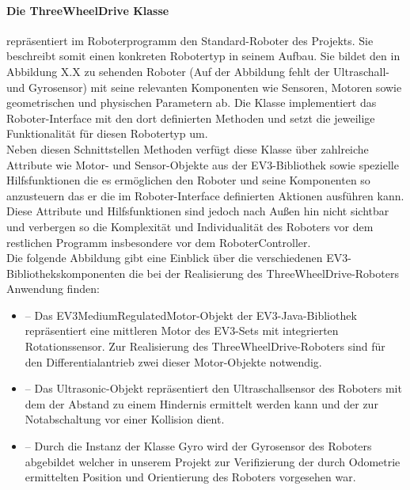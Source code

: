 \paragraph{Die ThreeWheelDrive Klasse}
\color{process}             %
repräsentiert im Roboterprogramm den \glqq{}Standard\grqq{}-Roboter des Projekts. Sie beschreibt somit einen konkreten 
Robotertyp in seinem Aufbau. Sie bildet den in Abbildung X.X zu sehenden Roboter (Auf der Abbildung fehlt der Ultraschall- und Gyrosensor) 
mit seine relevanten Komponenten wie Sensoren, 
Motoren sowie geometrischen und physischen Parametern ab. Die Klasse implementiert das Roboter-Interface mit den dort definierten 
Methoden und setzt die jeweilige Funktionalität für diesen Robotertyp um.\\
Neben diesen Schnittstellen Methoden verfügt diese Klasse über zahlreiche Attribute wie Motor- und Sensor-Objekte aus der 
EV3-Bibliothek sowie spezielle Hilfsfunktionen die es ermöglichen den Roboter und seine Komponenten so anzusteuern das er die im 
Roboter-Interface definierten Aktionen ausführen kann. Diese Attribute und Hilfsfunktionen sind jedoch nach Außen hin nicht
sichtbar und verbergen so die Komplexität und Individualität des Roboters vor dem restlichen Programm insbesondere vor dem 
RoboterController. \\
Die folgende Abbildung gibt eine Einblick über die verschiedenen EV3-Bibliothekskompo\-nenten die bei der Realisierung des 
ThreeWheelDrive-Roboters Anwendung finden:
\begin{itemize}
	\item{} -- Das EV3\-Medium\-RegulatedMotor-Objekt der EV3-Java-Bibliothek
	repräsentiert eine mittleren Motor des EV3-Sets mit integrierten Rotationssensor. Zur Realisierung des ThreeWheel\-Drive-Roboters
	sind für den Differentialantrieb zwei dieser Motor-Objekte notwendig.
	\item{} -- Das Ultrasonic-Objekt repräsentiert den Ultraschallsensor des Roboters mit dem der 
	Abstand zu einem Hindernis ermittelt werden kann und der zur Notabschaltung vor einer Kollision dient.
	\item{} -- Durch die Instanz der Klasse Gyro wird der Gyrosensor des Roboters abgebildet welcher in unserem
	Projekt zur Verifizierung der durch Odometrie ermittelten Position und Orientierung des Roboters vorgesehen war.
\end{itemize}
